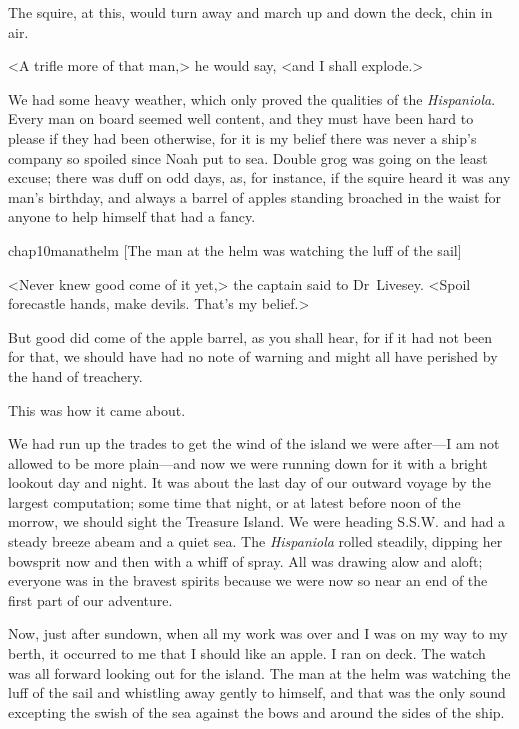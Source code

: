 The squire, at this, would turn away and march up and down the deck, chin in air.

<A trifle more of that man,> he would say, <and I shall explode.>

We had some heavy weather, which only proved the qualities of the \textit{Hispaniola}. Every man on board seemed well content, and they must have been hard to please if they had been otherwise, for it is my belief there was never a ship's company so spoiled since Noah put to sea. Double grog was going on the least excuse; there was duff on odd days, as, for instance, if the squire heard it was any man's birthday, and always a barrel of apples standing broached in the waist for anyone to help himself that had a fancy.

\begin{bwbigpic}
	[\basicscale]
	{chap10manathelm}
	[The man at the helm was watching the luff of the sail]
\end{bwbigpic}

<Never knew good come of it yet,> the captain said to Dr~Livesey. <Spoil forecastle hands, make devils. That's my belief.>

But good did come of the apple barrel, as you shall hear, for if it had not been for that, we should have had no note of warning and might all have perished by the hand of treachery.

This was how it came about.

We had run up the trades to get the wind of the island we were after—I am not allowed to be more plain—and now we were running down for it with a bright lookout day and night. It was about the last day of our outward voyage by the largest computation; some time that night, or at latest before noon of the morrow, we should sight the Treasure Island. We were heading S\@.S\@.W\@. and had a steady breeze abeam and a quiet sea. The \textit{Hispaniola} rolled steadily, dipping her bowsprit now and then with a whiff of spray. All was drawing alow and aloft; everyone was in the bravest spirits because we were now so near an end of the first part of our adventure.

Now, just after sundown, when all my work was over and I was on my way to my berth, it occurred to me that I should like an apple. I ran on deck. The watch was all forward looking out for the island. The man at the helm was watching the luff of the sail and whistling away gently to himself, and that was the only sound excepting the swish of the sea against the bows and around the sides of the ship.




